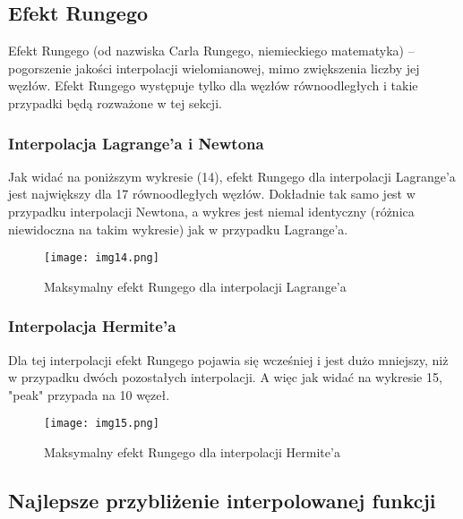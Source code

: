 \documentclass{article}
\begin{document}
\subsection{Efekt Rungego}

Efekt Rungego (od nazwiska Carla Rungego, niemieckiego matematyka) – pogorszenie jakości interpolacji wielomianowej, mimo zwiększenia liczby jej węzłów. Efekt Rungego występuje tylko dla węzłów równoodległych i takie przypadki będą rozważone w tej sekcji.

\subsubsection{Interpolacja Lagrange'a i Newtona}

Jak widać na poniższym wykresie (14), efekt Rungego dla interpolacji Lagrange'a jest największy dla 17 równoodległych węzłów. Dokładnie tak samo jest w przypadku interpolacji Newtona, a wykres jest niemal identyczny (różnica niewidoczna na takim wykresie) jak w przypadku Lagrange'a.

\begin{figure}[H]
  \centering
  \begin{minipage}[b]{0.93\textwidth}
    \texttt{[image: img14.png]}
    \caption{Maksymalny efekt Rungego dla interpolacji Lagrange'a}
  \end{minipage}
\end{figure}

\subsubsection{Interpolacja Hermite'a}

Dla tej interpolacji efekt Rungego pojawia się wcześniej i jest dużo mniejszy, niż w przypadku dwóch pozostałych interpolacji. A więc jak widać na wykresie 15, "peak" przypada na 10 węzeł.

\begin{figure}[H]
  \centering
  \begin{minipage}[b]{0.93\textwidth}
    \texttt{[image: img15.png]}
    \caption{Maksymalny efekt Rungego dla interpolacji Hermite'a}
  \end{minipage}
\end{figure}

\subsection{Najlepsze przybliżenie interpolowanej funkcji}
\end{document}
